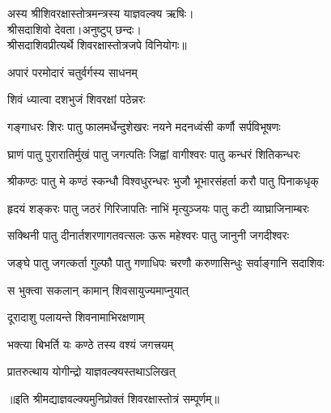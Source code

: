 
अस्य श्रीशिवरक्षास्तोत्रमन्त्रस्य याज्ञवल्क्य ऋषिः।\\
श्रीसदाशिवो देवता।अनुष्टुप् छन्दः।\\
श्रीसदाशिवप्रीत्यर्थे शिवरक्षास्तोत्रजपे विनियोगः॥

{अपारं परमोदारं चतुर्वर्गस्य साधनम्}

{शिवं ध्यात्वा दशभुजं शिवरक्षां पठेन्नरः}


\resetShloka
\twolineshloka
{गङ्गाधरः शिरः पातु फालमर्धेन्दुशेखरः}
{नयने मदनध्वंसी कर्णौ सर्पविभूषणः}

\twolineshloka
{घ्राणं पातु पुरारातिर्मुखं पातु जगत्पतिः}
{जिह्वां वागीश्वरः पातु कन्धरं शितिकन्धरः}

\twolineshloka
{श्रीकण्ठः पातु मे कण्ठं स्कन्धौ विश्वधुरन्धरः}
{भुजौ भूभारसंहर्ता करौ पातु पिनाकधृक्}

\twolineshloka
{हृदयं शङ्करः पातु जठरं गिरिजापतिः}
{नाभिं मृत्युञ्जयः पातु कटी व्याघ्राजिनाम्बरः}

\twolineshloka
{सक्थिनी पातु दीनार्तशरणागतवत्सलः}
{ऊरू महेश्वरः पातु जानुनी जगदीश्वरः}

\twolineshloka
{जङ्घे पातु जगत्कर्ता गुल्फौ पातु गणाधिपः}
{चरणौ करुणासिन्धुः सर्वाङ्गानि सदाशिवः}

{स भुक्त्वा सकलान् कामान् शिवसायुज्यमाप्नुयात्}

{दूरादाशु पलायन्ते शिवनामाभिरक्षणाम्}

{भक्त्या बिभर्ति यः कण्ठे तस्य वश्यं जगत्त्रयम्}

{प्रातरुत्थाय योगीन्द्रो याज्ञवल्क्यस्तथाऽलिखत्}

॥इति श्रीमद्याज्ञवल्क्यमुनिप्रोक्तं शिवरक्षास्तोत्रं सम्पूर्णम्॥